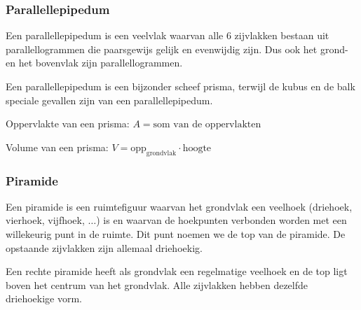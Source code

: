\subsubsection{Parallellepipedum}
\begin{definitie}
	Een parallellepipedum is een veelvlak waarvan alle 6 zijvlakken bestaan uit parallellogrammen die paarsgewijs gelijk en evenwijdig zijn. Dus ook het grond- en het bovenvlak zijn parallellogrammen. 

\end{definitie}
Een parallellepipedum is een bijzonder scheef prisma, terwijl de kubus en de balk speciale gevallen zijn van een parallellepipedum.




\begin{ftonthoud}
			
		Oppervlakte van een prisma: $A=\text{som van de oppervlakten}$
		
		Volume van een prisma: $V=\text{opp}_{\text{grondvlak}}\cdot \text{hoogte}$

\end{ftonthoud}		

\subsubsection{Piramide}
\begin{definitie}
	Een piramide is een ruimtefiguur waarvan het grondvlak een veelhoek (driehoek, vierhoek, vijfhoek, $\ldots$) is en waarvan de hoekpunten verbonden worden met een willekeurig punt in de ruimte. Dit punt noemen we de top van de piramide. De opstaande zijvlakken zijn allemaal driehoekig. 

\end{definitie}
Een rechte piramide heeft als grondvlak een regelmatige veelhoek en de top ligt boven het centrum van het grondvlak. Alle zijvlakken hebben dezelfde driehoekige vorm.

%



